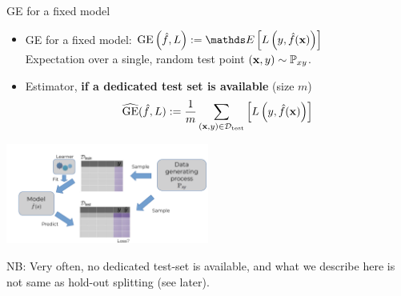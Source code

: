 \documentclass[11pt,compress,t,notes=noshow, xcolor=table]{beamer}
\begin{document}
\begin{vbframe}{GE for a fixed model}
\begin{itemize}
  \item GE for a fixed model: $\GEfL := \E \left[ \Lyfhx \right]$\\
      Expectation over a single, random test point $(\mathbf{x}, y) \sim \mathbb{P}_{xy}$.
  \item Estimator, \textbf{if a dedicated test set is available} (size $m$) 
    $$\widehat{\mathrm{GE}}(\hat{f}, L) := \frac{1}{m}\sum_{(\mathbf{x}, y) \in \mathcal{D}_{\text{test}}} \left[ L\left(y, \hat{f}(\mathbf{x})\right) \right]$$
    
  
\end{itemize}

\begin{center}
\includegraphics[trim = 0 0 0 30, clip, width=0.5\textwidth]
{figure_man/evaluation-intro-ge.pdf}
\end{center}
  
\vfill

NB: Very often, no dedicated test-set is available, and what we describe here is not same
as hold-out splitting (see later).

\end{vbframe}
\end{document}
